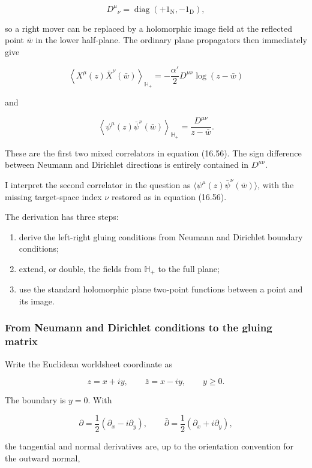 \documentclass[
  10pt,
  a4paper,
  openany]{book}
\providecommand{\tightlist}{%
  \setlength{\itemsep}{0pt}\setlength{\parskip}{0pt}}
\begin{document}
\[
D^\mu{}_\nu
=\operatorname{diag}(+1_{\mathrm N},-1_{\mathrm D}),
\]

so a right mover can be replaced by a holomorphic image field at the
reflected point \(\bar w\) in the lower half-plane. The ordinary plane
propagators then immediately give

\[
\boxed{
\left\langle X^\mu(z)\bar X^\nu(\bar w)\right\rangle_{\mathbb H_+}
=-\frac{\alpha'}2D^{\mu\nu}\log(z-\bar w)
}
\]

and

\[
\boxed{
\left\langle\psi^\mu(z)\bar\psi^\nu(\bar w)\right\rangle_{\mathbb H_+}
=\frac{D^{\mu\nu}}{z-\bar w}.
}
\]

These are the first two mixed correlators in equation (16.56). The sign
difference between Neumann and Dirichlet directions is entirely
contained in \(D^{\mu\nu}\).

I interpret the second correlator in the question as
\(\langle\psi^\mu(z)\bar\psi^\nu(\bar w)\rangle\), with the missing
target-space index \(\nu\) restored as in equation (16.56).

The derivation has three steps:

\begin{enumerate}
\def\labelenumi{\arabic{enumi}.}
\tightlist
\item
  derive the left-right gluing conditions from Neumann and Dirichlet
  boundary conditions;
\item
  extend, or double, the fields from \(\mathbb H_+\) to the full plane;
\item
  use the standard holomorphic plane two-point functions between a point
  and its image.
\end{enumerate}

\subsubsection{From Neumann and Dirichlet conditions to the gluing
matrix}\label{from-neumann-and-dirichlet-conditions-to-the-gluing-matrix}

Write the Euclidean worldsheet coordinate as

\[
z=x+iy,
\qquad
\bar z=x-iy,
\qquad
y\geq0.
\]

The boundary is \(y=0\). With

\[
\partial=\frac12(\partial_x-i\partial_y),
\qquad
\bar\partial=\frac12(\partial_x+i\partial_y),
\]

the tangential and normal derivatives are, up to the orientation
convention for the outward normal,
\end{document}
